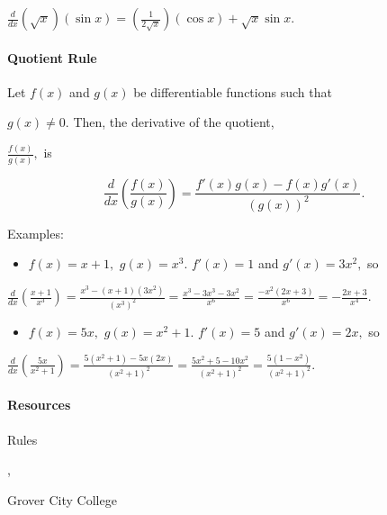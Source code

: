 {{{    $\frac{d}{dx}(\sqrt{x})(\sin{x}) = \left(\frac{1}{2\sqrt{x}}\right)(\cos{x}) + \sqrt{x}\sin{x}.$



\paragraph{Quotient Rule}



Let $f(x)$ and $g(x)$ be differentiable functions such that

$g(x) \neq 0.$ Then, the derivative of the quotient,

$\frac{f(x)}{g(x)},$ is



$$\frac{d}{dx}\left(\frac{f(x)}{g(x)}\right) = \frac{f'(x)g(x) - f(x)g'(x)}{(g(x))^2}.$$



Examples:



\begin{itemize}
    \item $f(x) = x + 1,$ $g(x) = x^3.$ $f'(x) = 1$ and $g'(x) = 3x^2,$ so
\end{itemize}
    $\frac{d}{dx}\left(\frac{x+1}{x^3}\right) = \frac{x^3 - (x+1)(3x^2)}{(x^3)^2} = \frac{x^3 - 3x^3 - 3x^2}{x^6} = \frac{-x^2(2x + 3)}{x^6} = -\frac{2x + 3}{x^4}.$



\begin{itemize}
    \item $f(x) = 5x,$ $g(x) = x^2 + 1.$ $f'(x) = 5$ and $g'(x) = 2x,$ so
\end{itemize}
    $\frac{d}{dx}\left(\frac{5x}{x^2 + 1}\right) = \frac{5(x^2+1) - 5x(2x)}{(x^2 + 1)^2} = \frac{5x^2+5 - 10x^2}{(x^2 + 1)^2} = \frac{5(1 - x^2)}{(x^2 + 1)^2}.$



\paragraph{Resources}



\begin{itemize}
    \item \href{http://www2.gcc.edu/dept/math/faculty/BancroftED/buscalc/chapter2/section2-4.php}{Product and Quotient
\end{itemize}
    Rules},

    Grover City College

}}
